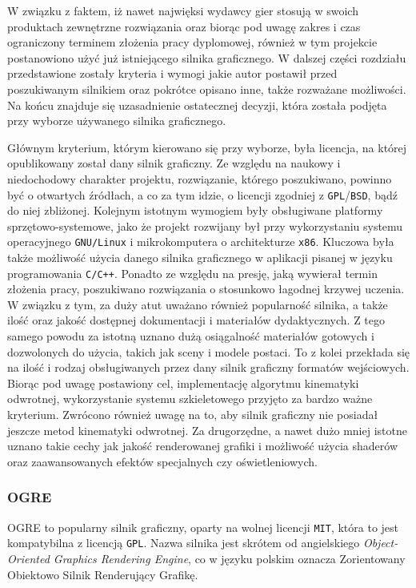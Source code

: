 \documentclass[11pt]{mwrep}
\begin{document}
    W związku z faktem, iż nawet najwięksi wydawcy gier stosują w swoich produktach zewnętrzne rozwiązania oraz biorąc pod uwagę zakres i czas ograniczony terminem złożenia pracy dyplomowej, również w tym projekcie postanowiono użyć już istniejącego silnika graficznego. W dalszej części rozdziału przedstawione zostały kryteria i wymogi jakie autor postawił przed poszukiwanym silnikiem oraz pokrótce opisano inne, także rozważane możliwości. Na końcu znajduje się uzasadnienie ostatecznej decyzji, która została podjęta przy wyborze używanego silnika graficznego.


    Głównym kryterium, którym kierowano się przy wyborze, była licencja, na której opublikowany został dany silnik graficzny. Ze względu na naukowy i niedochodowy charakter projektu, rozwiązanie, którego poszukiwano, powinno być o otwartych źródłach, a co za tym idzie, o licencji zgodniej z \texttt{GPL}/\texttt{BSD}, bądź do niej zbliżonej. Kolejnym istotnym wymogiem były obsługiwane platformy sprzętowo-sys\-te\-mo\-we, jako że projekt rozwijany był przy wykorzystaniu systemu operacyjnego \texttt{GNU/Linux} i mikrokomputera o architekturze \texttt{x86}. Kluczowa była także możliwość użycia danego silnika graficznego w aplikacji pisanej w języku programowania \texttt{C/C++}. Ponadto ze względu na presję, jaką wywierał termin złożenia pracy, poszukiwano rozwiązania o stosunkowo łagodnej krzywej uczenia. W związku z tym, za duży atut uważano również popularność silnika, a także ilość oraz jakość dostępnej dokumentacji i materiałów dydaktycznych. Z tego samego powodu za istotną uznano dużą osiągalność materiałów gotowych i dozwolonych do użycia, takich jak sceny i modele postaci. To z kolei przekłada się na ilość i rodzaj obsługiwanych przez dany silnik graficzny formatów wejściowych. Biorąc pod uwagę postawiony cel, implementację algorytmu kinematyki odwrotnej, wykorzystanie systemu szkieletowego przyjęto za bardzo ważne kryterium. Zwrócono również uwagę na to, aby silnik graficzny nie posiadał jeszcze metod kinematyki odwrotnej. Za drugorzędne, a nawet dużo mniej istotne uznano takie cechy jak jakość renderowanej grafiki i możliwość użycia shaderów oraz zaawansowanych efektów specjalnych czy oświetleniowych.

 
      \subsubsection{OGRE}
 
      OGRE to popularny silnik graficzny, oparty na wolnej licencji \texttt{MIT}, która to jest kompatybilna z licencją \texttt{GPL}. Nazwa silnika jest skrótem od angielskiego \textit{Object-Oriented Graphics Rendering Engine}, co w języku polskim oznacza Zorientowany Obiektowo Silnik Renderujący Grafikę.
\end{document}

